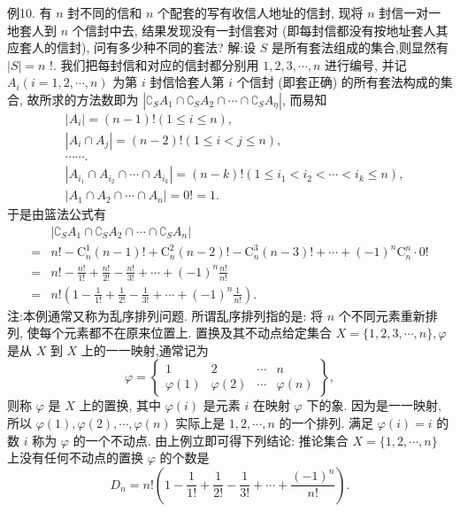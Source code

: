 例10. 有 $n$ 封不同的信和 $n$ 个配套的写有收信人地址的信封, 现将 $n$ 封信一对一地套人到 $n$ 个信封中去, 结果发现没有一封信套对 (即每封信都没有按地址套人其应套人的信封), 问有多少种不同的套法?
解:设 $S$ 是所有套法组成的集合,则显然有 $|S|=n$ !. 我们把每封信和对应的信封都分别用 $1,2,3, \cdots, n$ 进行编号, 并记 $A_i(i=1,2, \cdots, n)$ 为第 $i$ 封信恰套人第 $i$ 个信封 (即套正确) 的所有套法构成的集合, 故所求的方法数即为 $\left|\complement_S A_1 \cap \complement_S A_2 \cap \cdots \cap \complement_S A_\eta\right|$, 而易知
$$
\begin{aligned}
& \left|A_i\right|=(n-1) !(1 \leqslant i \leqslant n), \\
& \left|A_i \cap A_j\right|=(n-2) !(1 \leqslant i<j \leqslant n), \\
& \cdots \cdots . \\
& \left|A_{i_1} \cap A_{i_2} \cap \cdots \cap A_{i_k}\right|=(n-k) !\left(1 \leqslant i_1<i_2<\cdots<i_k \leqslant n\right), \\
& \left|A_1 \cap A_2 \cap \cdots \cap A_n\right|=0 !=1 .
\end{aligned}
$$
于是由篮法公式有
$$
\begin{aligned}
& \left|\complement_S A_1 \cap \complement_S A_2 \cap \cdots \cap \complement_S A_n\right| \\
= & n !-\mathrm{C}_n^1(n-1) !+\mathrm{C}_n^2(n-2) !-\mathrm{C}_n^3(n-3) !+\cdots+(-1)^n \mathrm{C}_n^n \cdot 0 ! \\
= & n !-\frac{n !}{1 !}+\frac{n !}{2 !}-\frac{n !}{3 !}+\cdots+(-1)^n \frac{n !}{n !} \\
= & n !\left(1-\frac{1}{1 !}+\frac{1}{2 !}-\frac{1}{3 !}+\cdots+(-1)^n \frac{1}{n !}\right) .
\end{aligned}
$$
注:本例通常又称为乱序排列问题.
所谓乱序排列指的是: 将 $n$ 个不同元素重新排列, 使每个元素都不在原来位置上.
置换及其不动点给定集合 $X=\{1,2,3, \cdots, n\}, \varphi$ 是从 $X$ 到 $X$ 上的一一映射,通常记为
$$
\varphi=\left\{\begin{array}{cccc}
1 & 2 & \cdots & n \\
\varphi(1) & \varphi(2) & \cdots & \varphi(n)
\end{array}\right\},
$$
则称 $\varphi$ 是 $X$ 上的置换, 其中 $\varphi(i)$ 是元素 $i$ 在映射 $\varphi$ 下的象.
因为是一一映射, 所以 $\varphi(1), \varphi(2), \cdots, \varphi(n)$ 实际上是 $1,2, \cdots, n$ 的一个排列.
满足 $\varphi(i)=i$ 的数 $i$ 称为 $\varphi$ 的一个不动点.
由上例立即可得下列结论:
推论集合 $X=\{1,2, \cdots, n\}$ 上没有任何不动点的置换 $\varphi$ 的个数是
$$
D_n=n !\left(1-\frac{1}{1 !}+\frac{1}{2 !}-\frac{1}{3 !}+\cdots+\frac{(-1)^n}{n !}\right) .
$$




